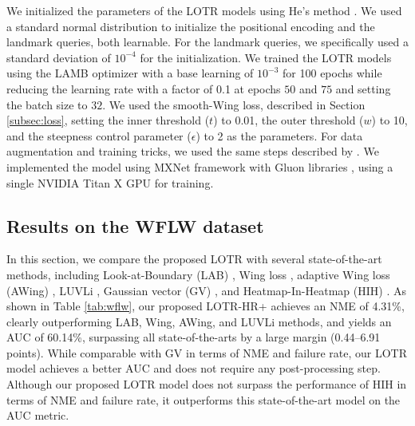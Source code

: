 \documentclass[journal]{IEEEtran}
\begin{document}
We initialized the parameters of the LOTR models using He's method \cite{he2015}. 
We used a standard normal distribution to initialize the positional encoding and the landmark queries, both learnable.
For the landmark queries, we specifically used a standard deviation of $10^{-4}$ for the initialization.
We trained the LOTR models using the LAMB optimizer \cite{You2019a} with a base learning of $10^{-3}$ for 100 epochs while reducing the learning rate with a factor of 0.1 at epochs $50$ and $75$ and setting the batch size to $32$.
We used the smooth-Wing loss, described in Section \ref{subsec:loss}, setting the inner threshold ($t$) to 0.01, the outer threshold ($w$) to 10, and the steepness control parameter ($\epsilon$) to 2
as the parameters.
For data augmentation and training tricks, we used the same steps described by \cite{earp2021sub}.
We implemented the model using MXNet framework \cite{chen2015} with Gluon libraries \cite{guo2020}, using a single NVIDIA Titan X GPU for training.

\subsection{Results on the WFLW dataset}\label{subsubsec:wflw}

In this section, we compare the proposed LOTR with several state-of-the-art methods, including Look-at-Boundary (LAB) \cite{Wu2018}, Wing loss \cite{Feng2017}, adaptive Wing loss (AWing) \cite{Wang2019c}, LUVLi \cite{Kumar2020}, Gaussian vector (GV) \cite{xiong2020}, and Heatmap-In-Heatmap (HIH) \cite{lan2021hih}. As shown in Table \ref{tab:wflw}, our proposed LOTR-HR+ achieves an NME of 4.31\%, clearly outperforming LAB, Wing, AWing, and LUVLi methods, and yields an AUC of 60.14\%, surpassing all state-of-the-arts by a large margin (0.44--6.91 points).
While comparable with GV in terms of NME and failure rate, our LOTR model achieves a better AUC and does not require any post-processing step.
Although our proposed LOTR model does not surpass the performance of HIH in terms of NME and failure rate, it outperforms this state-of-the-art model on the AUC metric.
\end{document}
